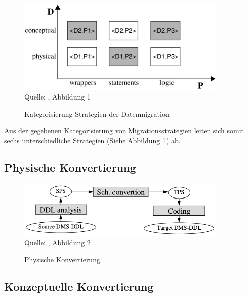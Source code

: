 \begin{figure}[h!]
	\centering
	\caption{Kategorisierung Strategien der Datenmigration}
	\label{pic:strategien}
	\includegraphics[width=0.9\textwidth]{../images/strategies_fig_01.png} \\
	\tiny Quelle: \citep{henrard-2002}, Abbildung 1
\end{figure}

Aus der gegebenen Kategorisierung von Migrationsstrategien leiten sich somit sechs unterschiedliche Strategien (Siehe Abbildung \ref{pic:strategien}) ab.

\subsection{Physische Konvertierung}

\begin{figure}[h!]
	\centering
	\caption{Physische Konvertierung}
	\label{pic:conversion_physical}
	\includegraphics[width=0.9\textwidth]{../images/strategies_fig_02a.png} \\
	\tiny Quelle: \citep{henrard-2002}, Abbildung 2
\end{figure}

\subsection{Konzeptuelle Konvertierung}

